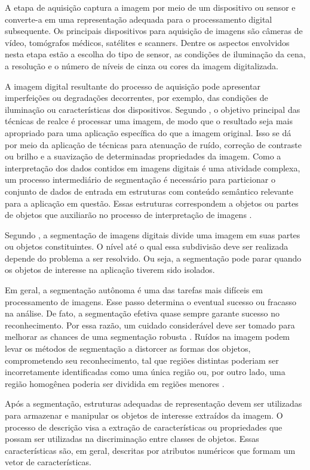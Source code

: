 \documentclass[12pt,oneside,a4paper,english,french,spanish,brazil,]{abntex2}
\begin{document}
A etapa de aquisição captura a imagem por meio de um dispositivo ou sensor e converte-a em uma representação adequada para o processamento digital subsequente. Os principais dispositivos para aquisição de imagens são câmeras de vídeo, tomógrafos médicos, satélites e scanners. Dentre os aspectos envolvidos nesta etapa estão a escolha do tipo de sensor, as condições de iluminação da cena, a resolução e o número de níveis de cinza ou cores da imagem digitalizada.

A imagem digital resultante do processo de aquisição pode apresentar imperfeições ou degradações decorrentes, por exemplo, das condições de iluminação ou características dos dispositivos. Segundo \citet{gonzalez:2012}, o objetivo principal das técnicas de realce é processar uma imagem, de modo que o resultado seja mais apropriado para uma aplicação específica do que a imagem original. Isso se dá por meio da aplicação de técnicas para atenuação de ruído, correção de contraste ou brilho e a suavização de determinadas propriedades da imagem.
Como a interpretação dos dados contidos em imagens digitais é uma atividade complexa, um processo intermediário de segmentação é necessário para particionar o conjunto de dados de entrada em estruturas com conteúdo semântico relevante para a aplicação em questão. Essas estruturas correspondem a objetos ou partes de objetos que auxiliarão no processo de interpretação de imagens \cite{pedrini:2008}.

Segundo \citet{gonzalez:2012}, a segmentação de imagens digitais divide uma imagem em suas partes ou objetos constituintes. O nível até o qual essa subdivisão deve ser realizada depende do problema a ser resolvido. Ou seja, a segmentação pode parar quando os objetos de interesse na aplicação tiverem sido isolados.

Em geral, a segmentação autônoma é uma das tarefas mais difíceis em processamento de imagens. Esse passo determina o eventual sucesso ou fracasso na análise. De fato, a segmentação efetiva quase sempre garante sucesso no reconhecimento. Por essa razão, um cuidado considerável deve ser tomado para melhorar as chances de uma segmentação robusta \cite{gonzalez:2012}. Ruídos na imagem podem levar os métodos de segmentação a distorcer as formas dos objetos, comprometendo seu reconhecimento, tal que regiões distintas poderiam ser incorretamente identificadas como uma única região ou, por outro lado, uma região homogênea poderia ser dividida em regiões menores \cite{pedrini:2008}.

Após a segmentação, estruturas adequadas de representação devem ser utilizadas para armazenar e manipular os objetos de interesse extraídos da imagem. O processo de descrição visa a extração de características ou propriedades que possam ser utilizadas na discriminação entre classes de objetos. Essas características são, em geral, descritas por atributos numéricos que formam um vetor de características.
\end{document}
